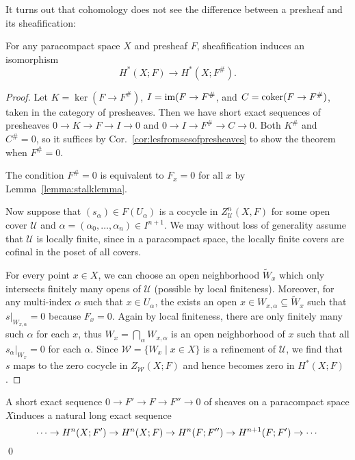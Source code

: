\documentclass[a4paper,openany]{scrbook}
\begin{document}
It turns out that cohomology does not see the difference between a presheaf and its sheafification:

\begin{thm}\label{thm:cohomologyinvariantundersheafification}
For any paracompact space $X$ and presheaf $F$, sheafification induces an isomorphism
\[
H^*(X;F) \to H^*(X;F^\#).
\]
\end{thm}
\begin{proof}
Let $K=\ker(F \to F^\#)$, $I = \operatorname{im}(F \to F^\#$, and $C = \operatorname{coker}(F \to F^\#)$, taken in the category of presheaves. Then we have short exact sequences of presheaves $0 \to K \to F \to I \to 0$ and $0 \to I \to F^\# \to C \to 0$. Both $K^\#$ and $C^\#=0$, so it suffices by Cor.~\ref{cor:lesfromsesofpresheaves} to show the theorem when $F^\#=0$.

The condition $F^\#=0$ is equivalent to $F_x=0$ for all $x$ by Lemma~\ref{lemma:stalklemma}.

Now suppose that $(s_{\alpha}) \in F(U_\alpha)$ is a cocycle in $Z^{n}_{\mathcal U}(X,F)$ for some open cover $\mathcal U$ and $\alpha=(\alpha_0,\dots,\alpha_n) \in I^{n+1}$. We may without loss of generality assume that $\mathcal U$ is locally finite, since in a paracompact space, the locally finite covers are cofinal in the poset of all covers.

For every point $x \in X$, we can choose an open neighborhood $\tilde W_x$ which only intersects finitely many opens of $\mathcal U$ (possible by local finiteness). Moreover, for any multi-index $\alpha$ such that $x \in U_\alpha$, the exists an open $x \in W_{x,\alpha} \subseteq \tilde W_x$ such that $s|_{W_{x,\alpha}} = 0$ because $F_x=0$. Again by local finiteness, there are only finitely many such $\alpha$ for each $x$, thus $W_x = \bigcap_{\alpha} W_{x,\alpha}$ is an open neighborhood of $x$ such that all $s_{\alpha}|_{W_x}=0$ for each $\alpha$. Since $\mathcal W = \{W_x \mid x \in X\}$ is a refinement of $\mathcal U$, we find that $s$ maps to the zero cocycle in $Z_{\mathcal W}(X;F)$ and hence becomes zero in $H^*(X;F)$. 
\end{proof}

\begin{corollary}\label{cor:lesforsesofsheaves}
A short exact sequence $0 \to F' \to F \to F'' \to 0$ of sheaves on a paracompact space $X$induces a natural long exact sequence
\[
\cdots \to H^n(X;F') \to H^n(X;F) \to H^n(F;F'') \to H^{n+1}(F;F') \to \cdots \qedhere
\]\qed
\end{corollary}
\end{document}
